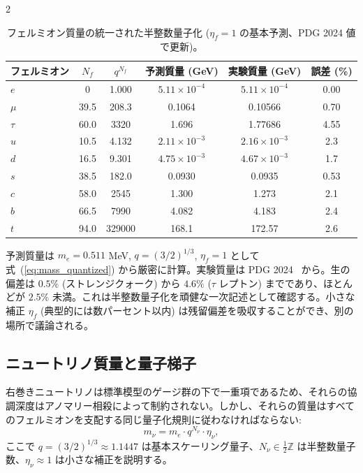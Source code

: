 \documentclass[11pt,a4paper]{article}
\theoremstyle{remark}
\begin{document}
\begin{multicols}{2}
		\begin{table}[H]
			\centering
			\caption{フェルミオン質量の統一された半整数量子化 (\(\eta_f=1\) の基本予測、PDG 2024 値で更新)。}
			\label{tab:fermions_new}
			\tiny  
			\begin{tabular}{l c c c c c}
				\toprule
				フェルミオン & \(N_f\) & \(q^{N_f}\) & 予測質量 (GeV) & 実験質量 (GeV) & 誤差 (\%) \\
				\midrule
				\(e\)   & 0      & 1.000 & \(5.11\times10^{-4}\) & \(5.11\times10^{-4}\) & 0.00 \\
				\(\mu\)  & 39.5   & 208.3 & 0.1064                & 0.10566              & 0.70 \\
				\(\tau\) & 60.0   & 3320  & 1.696                 & 1.77686              & 4.55 \\
				\(u\)   & 10.5   & 4.132 & \(2.11\times10^{-3}\)   & \(2.16\times10^{-3}\)  & 2.3 \\
				\(d\)   & 16.5   & 9.301 & \(4.75\times10^{-3}\)   & \(4.67\times10^{-3}\)  & 1.7 \\
				\(s\)   & 38.5   & 182.0 & 0.0930                & 0.0935               & 0.53 \\
				\(c\)   & 58.0   & 2545  & 1.300                 & 1.273                & 2.1 \\
				\(b\)   & 66.5   & 7990  & 4.082                 & 4.183                & 2.4 \\
				\(t\)   & 94.0   & 329000& 168.1                 & 172.57               & 2.6 \\
				\bottomrule
			\end{tabular}
			\par\smallskip
			\footnotesize 
			予測質量は \(m_e = 0.511\) MeV, \(q = (3/2)^{1/3}\), \(\eta_f = 1\) として式~(\ref{eq:mass_quantized}) から厳密に計算。実験質量は PDG 2024~\cite{PDG2024} から。生の偏差は \(0.5\%\) (ストレンジクォーク) から \(4.6\%\) (\(\tau\) レプトン) までであり、ほとんどが \(2.5\%\) 未満。これは半整数量子化を頑健な一次記述として確認する。小さな補正 \(\eta_f\) (典型的には数パーセント以内) は残留偏差を吸収することができ、別の場所で議論される。
		\end{table}
		
		\subsection{ニュートリノ質量と量子梯子}
		
		右巻きニュートリノは標準模型のゲージ群の下で一重項であるため、それらの協調深度はアノマリー相殺によって制約されない。しかし、それらの質量はすべてのフェルミオンを支配する同じ量子化規則に従わなければならない:
		\begin{equation}
			m_\nu = m_e \cdot q^{N_\nu} \cdot \eta_\nu,
			\label{eq:neutrino_mass}
		\end{equation}
		ここで $q = (3/2)^{1/3} \approx 1.1447$ は基本スケーリング量子、$N_\nu \in \frac{1}{2}\mathbb{Z}$ は半整数量子数、$\eta_\nu \approx 1$ は小さな補正を説明する。
		

\end{multicols}
\end{document}
